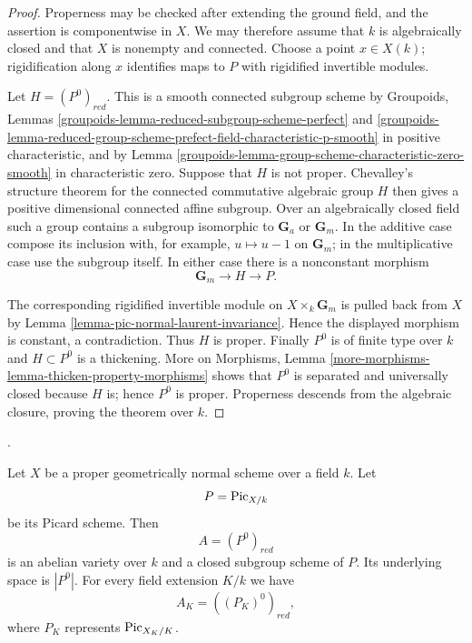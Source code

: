\begin{proof}
Properness may be checked after extending the ground field, and the assertion
is componentwise in $X$. We may therefore assume that $k$ is algebraically
closed and that $X$ is nonempty and connected. Choose a point $x\in X(k)$;
rigidification along $x$ identifies maps to $P$ with rigidified invertible
modules.

Let $H=(P^0)_{red}$. This is a smooth connected subgroup scheme by Groupoids,
Lemmas \ref{groupoids-lemma-reduced-subgroup-scheme-perfect} and
\ref{groupoids-lemma-reduced-group-scheme-prefect-field-characteristic-p-smooth}
in positive characteristic, and by
Lemma \ref{groupoids-lemma-group-scheme-characteristic-zero-smooth} in
characteristic zero. Suppose that $H$ is not proper. Chevalley's structure
theorem for the connected commutative algebraic group $H$ then gives a
positive dimensional connected affine subgroup. Over an algebraically closed
field such a group contains a subgroup isomorphic to $\mathbf G_a$ or
$\mathbf G_m$. In the additive case compose its inclusion with, for example,
$u\mapsto u-1$ on $\mathbf G_m$; in the multiplicative case use the subgroup
itself. In either case there is a nonconstant morphism
$$
\mathbf G_m\longrightarrow H\longrightarrow P.
$$

The corresponding rigidified invertible module on
$X\times_k\mathbf G_m$ is pulled back from $X$ by
Lemma \ref{lemma-pic-normal-laurent-invariance}. Hence the displayed morphism
is constant, a contradiction. Thus $H$ is proper. Finally $P^0$ is of finite
type over $k$ and $H\subset P^0$ is a thickening. More on Morphisms, Lemma
\ref{more-morphisms-lemma-thicken-property-morphisms} shows that $P^0$ is
separated and universally closed because $H$ is; hence $P^0$ is proper.
Properness descends from the algebraic closure, proving the theorem over $k$.
\end{proof}

\begin{lemma}
\label{corollary-picard-variety-normal-proper}
\begin{reference}
\cite[Expos\'e 236, Corollary 3.2, pp. 236--237]{FGA}.
\end{reference}
Let $X$ be a proper geometrically normal scheme over a field $k$. Let
$$
P=\mathrm{Pic}_{X/k}
$$
be its Picard scheme. Then
$$
A=(P^0)_{red}
$$
is an abelian variety over $k$ and a closed subgroup scheme of $P$. Its
underlying space is $|P^0|$. For every field extension $K/k$ we have
$$
A_K=((P_K)^0)_{red},
$$
where $P_K$ represents $\mathrm{Pic}_{X_K/K}$.
\end{lemma}

